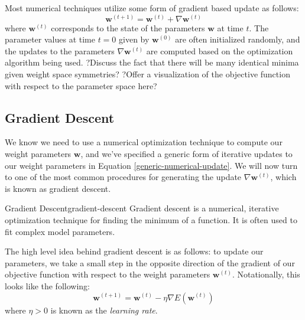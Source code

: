 
Most numerical techniques utilize some form of gradient based update as follows:
\begin{equation} \label{generic-numerical-update}
	\textbf{w}^{(t+1)} = \textbf{w}^{(t)} + \nabla \textbf{w}^{(t)}
\end{equation}
where $\textbf{w}^{(t)}$ corresponds to the state of the parameters $\textbf{w}$ at time $t$. The parameter values at time $t=0$ given by $\textbf{w}^{(0)}$ are often initialized randomly, and the updates to the parameters $\nabla\textbf{w}^{(t)}$ are computed based on the optimization algorithm being used. \newline
?Discuss the fact that there will be many identical minima given weight space symmetries? \newline
?Offer a visualization of the objective function with respect to the parameter space here?

\subsection{Gradient Descent}
We know we need to use a numerical optimization technique to compute our weight parameters $\textbf{w}$, and we've specified a generic form of iterative updates to our weight parameters in Equation \ref{generic-numerical-update}. We will now turn to one of the most common procedures for generating the update $\nabla\textbf{w}^{(t)}$, which is known as gradient descent.

\begin{definition}{Gradient Descent}{gradient-descent}
Gradient descent is a numerical, iterative optimization technique for finding the minimum of a function. It is often used to fit complex model parameters.
\end{definition}

The high level idea behind gradient descent is as follows: to update our parameters, we take a small step in the opposite direction of the gradient of our objective function with respect to the weight parameters $\textbf{w}^{(t)}$. Notationally, this looks like the following:
\begin{equation} \label{gradient-descent-equation}
	\textbf{w}^{(t+1)} = \textbf{w}^{(t)} - \eta \nabla E(\textbf{w}^{(t)})
\end{equation}
where $\eta > 0$ is known as the \textit{learning rate}.

